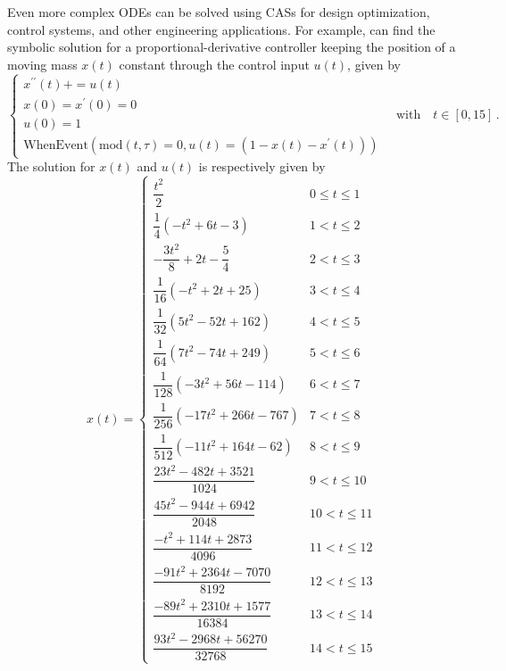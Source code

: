 \begin{example}
Even more complex \acp{ODE} can be solved using \acp{CAS} for design optimization, control systems, and other engineering applications. For example, \Mathematica{} can find the symbolic solution for a proportional-derivative controller keeping the position of a moving mass $x(t)$ constant through the control input $u(t)$, given by
%
\begin{equation*}
  \begin{cases}
    x^{\prime\prime}(t) + = u(t) \\[0.1em]
    x(0) = x^{\prime}(0) = 0 \\[0.1em]
    u(0) = 1 \\[0.1em]
    \mathrm{WhenEvent}(\mathrm{mod}(t, \tau) = 0, u(t) = (1 - x(t) - x^{\prime}(t)))
  \end{cases}
  \quad \text{with} \quad t \in [0, 15] \, \text{.}
\end{equation*}
%
The solution for $x(t)$ and $u(t)$ is respectively given by
%
\begin{equation*}
  x(t) = \begin{cases}
    \dfrac{t^2}{2} & 0\leq t\leq 1 \\[0.1em]
    \dfrac{1}{4} \left(-t^2+6 t-3\right) & 1<t\leq 2 \\[0.1em]
    -\dfrac{3 t^2}{8}+2 t-\dfrac{5}{4} & 2<t\leq 3 \\[0.1em]
    \dfrac{1}{16} \left(-t^2+2 t+25\right) & 3<t\leq 4 \\[0.1em]
    \dfrac{1}{32} \left(5 t^2-52 t+162\right) & 4<t\leq 5 \\[0.1em]
    \dfrac{1}{64} \left(7 t^2-74 t+249\right) & 5<t\leq 6 \\[0.1em]
    \dfrac{1}{128} \left(-3 t^2+56 t-114\right) & 6<t\leq 7 \\[0.1em]
    \dfrac{1}{256} \left(-17 t^2+266 t-767\right) & 7<t\leq 8 \\[0.1em]
    \dfrac{1}{512} \left(-11 t^2+164 t-62\right) & 8<t\leq 9 \\[0.1em]
    \dfrac{23 t^2-482 t+3521}{1024} & 9<t\leq 10 \\[0.1em]
    \dfrac{45 t^2-944 t+6942}{2048} & 10<t\leq 11 \\[0.1em]
    \dfrac{-t^2+114 t+2873}{4096} & 11<t\leq 12 \\[0.1em]
    \dfrac{-91 t^2+2364 t-7070}{8192} & 12<t\leq 13 \\[0.1em]
    \dfrac{-89 t^2+2310 t+1577}{16384} & 13<t\leq 14 \\[0.1em]
    \dfrac{93 t^2-2968 t+56270}{32768} & 14<t\leq 15

\end{cases}
\end{equation*}
\end{example}
